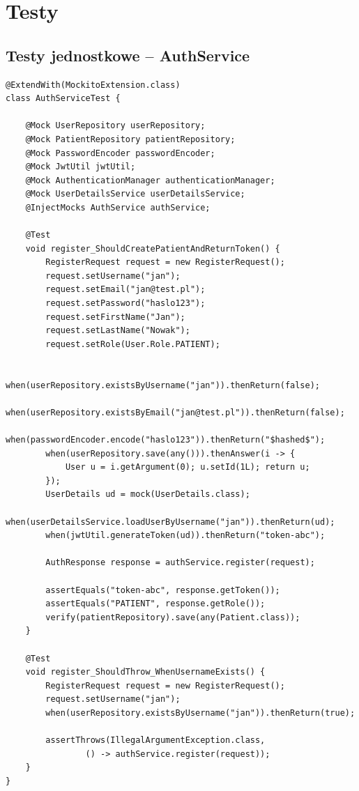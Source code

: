 \documentclass[12pt, a4paper]{article}
\begin{document}
\section{Testy}

\subsection{Testy jednostkowe -- AuthService}

\begin{lstlisting}[style=java, caption={Test rejestracji -- AuthServiceTest.java}]
@ExtendWith(MockitoExtension.class)
class AuthServiceTest {

    @Mock UserRepository userRepository;
    @Mock PatientRepository patientRepository;
    @Mock PasswordEncoder passwordEncoder;
    @Mock JwtUtil jwtUtil;
    @Mock AuthenticationManager authenticationManager;
    @Mock UserDetailsService userDetailsService;
    @InjectMocks AuthService authService;

    @Test
    void register_ShouldCreatePatientAndReturnToken() {
        RegisterRequest request = new RegisterRequest();
        request.setUsername("jan");
        request.setEmail("jan@test.pl");
        request.setPassword("haslo123");
        request.setFirstName("Jan");
        request.setLastName("Nowak");
        request.setRole(User.Role.PATIENT);

        when(userRepository.existsByUsername("jan")).thenReturn(false);
        when(userRepository.existsByEmail("jan@test.pl")).thenReturn(false);
        when(passwordEncoder.encode("haslo123")).thenReturn("$hashed$");
        when(userRepository.save(any())).thenAnswer(i -> {
            User u = i.getArgument(0); u.setId(1L); return u;
        });
        UserDetails ud = mock(UserDetails.class);
        when(userDetailsService.loadUserByUsername("jan")).thenReturn(ud);
        when(jwtUtil.generateToken(ud)).thenReturn("token-abc");

        AuthResponse response = authService.register(request);

        assertEquals("token-abc", response.getToken());
        assertEquals("PATIENT", response.getRole());
        verify(patientRepository).save(any(Patient.class));
    }

    @Test
    void register_ShouldThrow_WhenUsernameExists() {
        RegisterRequest request = new RegisterRequest();
        request.setUsername("jan");
        when(userRepository.existsByUsername("jan")).thenReturn(true);

        assertThrows(IllegalArgumentException.class,
                () -> authService.register(request));
    }
}
\end{lstlisting}
\end{document}
